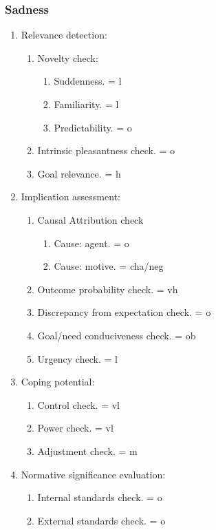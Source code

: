 \subsubsection{Sadness}

\begin{enumerate}
 \item  Relevance detection:
 \begin{enumerate}
  \item  Novelty check:
  \begin{enumerate}
   \item  Suddenness. = l
   \item  Familiarity. = l
   \item  Predictability. = o
  \end{enumerate}
  \item  Intrinsic pleasantness check. = o
  \item  Goal relevance. = h
 \end{enumerate}
 \item  Implication assessment:
 \begin{enumerate}
  \item  Causal Attribution check
  \begin{enumerate}
   \item  Cause: agent. = o
   \item  Cause: motive. = cha/neg
  \end{enumerate}
  \item  Outcome probability check. = vh
  \item  Discrepancy from expectation check. = o
  \item  Goal/need conduciveness check. = ob
  \item  Urgency check. = l
 \end{enumerate}
 \item  Coping potential:
 \begin{enumerate}
  \item  Control check. = vl
  \item  Power check. = vl
  \item  Adjustment check. = m
 \end{enumerate}
 \item  Normative significance evaluation:
 \begin{enumerate}
  \item  Internal standards check. = o
  \item  External standards check. = o
 \end{enumerate}
\end{enumerate}

